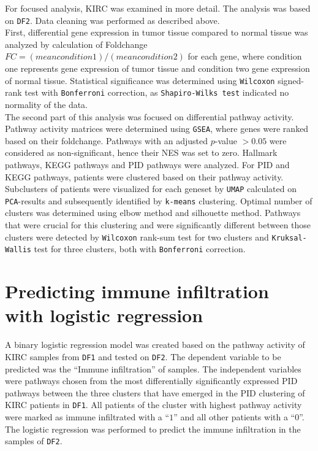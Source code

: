 \documentclass[
  parskip,
  oneside]{scrreprt}
\begin{document}
For focused analysis, KIRC was examined in more detail. The analysis was
based on \texttt{DF2}. Data cleaning was performed as described above.\\
First, differential gene expression in tumor tissue compared to normal
tissue was analyzed by calculation of Foldchange
\(FC =(mean condition 1) / (mean condition 2)\) for each gene, where
condition one represents gene expression of tumor tissue and condition
two gene expression of normal tissue. Statistical significance was
determined using \texttt{Wilcoxon} signed-rank test with
\texttt{Bonferroni} correction, as \texttt{Shapiro-Wilks\ test}
indicated no normality of the data.\\
The second part of this analysis was focused on differential pathway
activity. Pathway activity matrices were determined using \texttt{GSEA},
where genes were ranked based on their foldchange. Pathways with an
adjusted \(p\)-value \(>0.05\) were considered as non-significant, hence
their NES was set to zero. Hallmark pathways, KEGG pathways and PID
pathways were analyzed. For PID and KEGG pathways, patients were
clustered based on their pathway activity. Subclusters of patients were
visualized for each geneset by \texttt{UMAP} calculated on
\texttt{PCA}-results and subsequently identified by \texttt{k-means}
clustering. Optimal number of clusters was determined using elbow method
and silhouette method. Pathways that were crucial for this clustering
and were significantly different between those clusters were detected by
\texttt{Wilcoxon} rank-sum test for two clusters and
\texttt{Kruksal-Wallis} test for three clusters, both with
\texttt{Bonferroni} correction.

\hypertarget{predicting-immune-infiltration-with-logistic-regression}{%
\section{Predicting immune infiltration with logistic
regression}\label{predicting-immune-infiltration-with-logistic-regression}}

A binary logistic regression model was created based on the pathway
activity of KIRC samples from \texttt{DF1} and tested on \texttt{DF2}.
The dependent variable to be predicted was the ``Immune infiltration''
of samples. The independent variables were pathways chosen from the most
differentially significantly expressed PID pathways between the three
clusters that have emerged in the PID clustering of KIRC patients in
\texttt{DF1}. All patients of the cluster with highest pathway activity
were marked as immune infiltrated with a ``\(1\)'' and all other
patients with a ``\(0\)''. The logistic regression was performed to
predict the immune infiltration in the samples of \texttt{DF2}.
\end{document}
